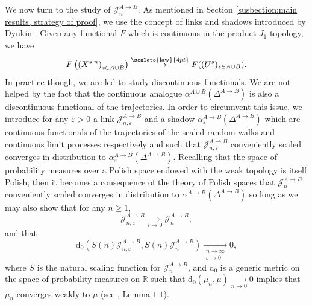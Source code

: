\documentclass[12pt]{article}
\newcommand{\RR}{\mathbb R}
\newcommand{\J}{\mathcal J}
\newcommand{\1}{\mathds{1}}
\renewcommand{\d}{\mathrm d}
\newcommand{\distribution}{\stackrel{\scaleto{\mathrm{law}}{4pt}}{\longrightarrow}}
\numberwithin{equation}{section}
\begin{document}
We now turn to the study of $\J_n^{A\rightarrow B}$. As mentioned in Section \ref{susbection:main results, strategy of proof}, we use the concept of links and shadows introduced by Dynkin \cite{DynkinSelf-IntersectionGauge1988}. Given any functional $F$ which is continuous in the product $J_1$ topology, we have
\begin{equation*}
    F\left(\left(X^{s,n}\right)_{s\in A\cup B}\right)\distribution F((U^s)_{s\in A\cup B}).
\end{equation*}
In practice though, we are led to study discontinuous functionals. We are not helped by the fact that the continuous analogue $\alpha^{A\cup B}(\Delta^{A\rightarrow B})$ is also a discontinuous functional of the trajectories. In order to circumvent this issue, we introduce for any $\varepsilon>0$ a link $\J_{n,\varepsilon}^{A\rightarrow B}$ and a shadow $\alpha_\varepsilon^{A\rightarrow B}(\Delta^{A\rightarrow B})$ which are continuous functionals of the trajectories of the scaled random walks and continuous limit processes respectively and such that $\J_{n,\varepsilon}^{A\rightarrow B}$ conveniently scaled converges in distribution to $\alpha_\varepsilon^{A\rightarrow B}(\Delta^{A\rightarrow B})$. Recalling that the space of probability measures over a Polish space endowed with the weak topology is itself Polish, then it becomes a consequence of the theory of Polish spaces that $\J_n^{A\rightarrow B}$ conveniently scaled converges in distribution to $\alpha^{A\rightarrow B}(\Delta^{A\rightarrow B})$ so long as we may also show that for any $n\ge1$,
\begin{equation}
\label{convergence:the link is close to the initial variable at n fixed}
    \J_{n,\varepsilon}^{A\rightarrow B}\underset{\varepsilon\rightarrow 0}\implies \J_n^{A\rightarrow B},
\end{equation}
and that 
\begin{equation}
    \label{convergence:the link is close to the initial variable uniformly strongly}
    \d_0\left( S(n)\J_{n,\varepsilon}^{A\rightarrow B},S(n)\J_n^{A\rightarrow B}\right)\underset{\substack{n\rightarrow\infty \\ \varepsilon\rightarrow 0}}\longrightarrow0,
\end{equation}
where $S$ is the natural scaling function for $\J_n^{A\rightarrow B}$, and $\d_0$ is a generic metric on the space of probability measures on $\RR$ such that $\d_0(\mu_n,\mu)\underset{n\rightarrow0}\longrightarrow0$ implies that $\mu_n$ converges weakly to $\mu$ (see \cite{DynkinSelf-IntersectionGauge1988}, Lemma $1.1$).
\end{document}
